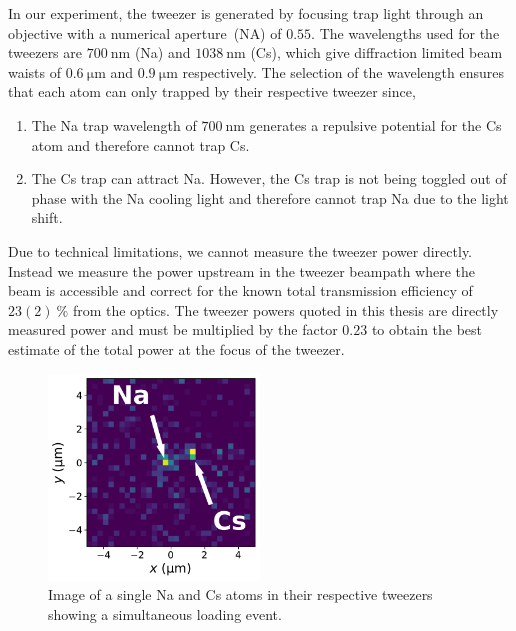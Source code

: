 In our experiment, the tweezer is generated by focusing trap light
through an objective with a numerical aperture~(NA) of $0.55$.
The wavelengths used for the tweezers are $700~\mathrm{nm}$ (Na) and $1038~\mathrm{nm}$ (Cs),
which give diffraction limited beam waists of
$0.6~\mathrm{\mu m}$ and $0.9~\mathrm{\mu m}$ respectively.
The selection of the wavelength ensures that each atom can only trapped
by their respective tweezer since,
\begin{enumerate}
\item The Na trap wavelength of $700~\mathrm{nm}$ generates a repulsive potential
  for the Cs atom and therefore cannot trap Cs.
\item The Cs trap can attract Na. However, the Cs trap is not being toggled
  out of phase with the Na cooling light and therefore cannot trap Na due to the light shift.
\end{enumerate}
Due to technical limitations, we cannot measure the tweezer power directly.
Instead we measure the power upstream in the tweezer beampath where the beam is accessible
and correct for the known total transmission efficiency of $23(2)~\mathrm{\%}$ from the optics.
The tweezer powers quoted in this thesis are directly measured power
and must be multiplied by the factor $0.23$ to obtain
the best estimate of the total power at the focus of the tweezer.

\begin{figure}
  \centering
  \includegraphics[width=0.5\textwidth]{figures/loading_single_atoms.pdf}
  \caption[Image of single Na and Cs atoms.]{
    Image of a single Na and Cs atoms in their respective tweezers
    showing a simultaneous loading event.
    \label{fig:loading:loading:single-atoms}}
\end{figure}

